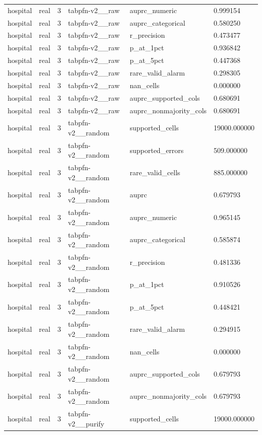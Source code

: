\begin{tabular}{llllll}
hospital & real & 3 & tabpfn-v2\_\_raw & auprc\_numeric & 0.999154 \\
hospital & real & 3 & tabpfn-v2\_\_raw & auprc\_categorical & 0.580250 \\
hospital & real & 3 & tabpfn-v2\_\_raw & r\_precision & 0.473477 \\
hospital & real & 3 & tabpfn-v2\_\_raw & p\_at\_1pct & 0.936842 \\
hospital & real & 3 & tabpfn-v2\_\_raw & p\_at\_5pct & 0.447368 \\
hospital & real & 3 & tabpfn-v2\_\_raw & rare\_valid\_alarm & 0.298305 \\
hospital & real & 3 & tabpfn-v2\_\_raw & nan\_cells & 0.000000 \\
hospital & real & 3 & tabpfn-v2\_\_raw & auprc\_supported\_cols & 0.680691 \\
hospital & real & 3 & tabpfn-v2\_\_raw & auprc\_nonmajority\_cols & 0.680691 \\
hospital & real & 3 & tabpfn-v2\_\_random & supported\_cells & 19000.000000 \\
hospital & real & 3 & tabpfn-v2\_\_random & supported\_errors & 509.000000 \\
hospital & real & 3 & tabpfn-v2\_\_random & rare\_valid\_cells & 885.000000 \\
hospital & real & 3 & tabpfn-v2\_\_random & auprc & 0.679793 \\
hospital & real & 3 & tabpfn-v2\_\_random & auprc\_numeric & 0.965145 \\
hospital & real & 3 & tabpfn-v2\_\_random & auprc\_categorical & 0.585874 \\
hospital & real & 3 & tabpfn-v2\_\_random & r\_precision & 0.481336 \\
hospital & real & 3 & tabpfn-v2\_\_random & p\_at\_1pct & 0.910526 \\
hospital & real & 3 & tabpfn-v2\_\_random & p\_at\_5pct & 0.448421 \\
hospital & real & 3 & tabpfn-v2\_\_random & rare\_valid\_alarm & 0.294915 \\
hospital & real & 3 & tabpfn-v2\_\_random & nan\_cells & 0.000000 \\
hospital & real & 3 & tabpfn-v2\_\_random & auprc\_supported\_cols & 0.679793 \\
hospital & real & 3 & tabpfn-v2\_\_random & auprc\_nonmajority\_cols & 0.679793 \\
hospital & real & 3 & tabpfn-v2\_\_purify & supported\_cells & 19000.000000 \\

\end{tabular}
